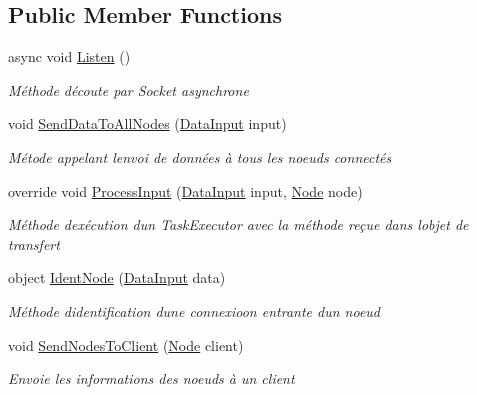 \subsection*{Public Member Functions}
\begin{DoxyCompactItemize}
\item 
async void \hyperlink{class_node_net_1_1_network_1_1_orch_1_1_orchestrator_a3adf37c5b27377234431ecdec0a2dc98}{Listen} ()
\begin{DoxyCompactList}\small\item\em Méthode d\textquotesingle{}écoute par Socket asynchrone \end{DoxyCompactList}\item 
void \hyperlink{class_node_net_1_1_network_1_1_orch_1_1_orchestrator_ad866995c960161d951c53c62cd4c446a}{Send\+Data\+To\+All\+Nodes} (\hyperlink{class_node_net_1_1_data_1_1_data_input}{Data\+Input} input)
\begin{DoxyCompactList}\small\item\em Métode appelant l\textquotesingle{}envoi de données à tous les noeuds connectés \end{DoxyCompactList}\item 
override void \hyperlink{class_node_net_1_1_network_1_1_orch_1_1_orchestrator_a1868c3dad9eb8763a7aaae1ef15862ed}{Process\+Input} (\hyperlink{class_node_net_1_1_data_1_1_data_input}{Data\+Input} input, \hyperlink{class_node_net_1_1_network_1_1_nodes_1_1_node}{Node} node)
\begin{DoxyCompactList}\small\item\em Méthode d\textquotesingle{}exécution d\textquotesingle{}un Task\+Executor avec la méthode reçue dans l\textquotesingle{}objet de transfert \end{DoxyCompactList}\item 
object \hyperlink{class_node_net_1_1_network_1_1_orch_1_1_orchestrator_a2cfb309a5a30e4bb85709b999c7d80ec}{Ident\+Node} (\hyperlink{class_node_net_1_1_data_1_1_data_input}{Data\+Input} data)
\begin{DoxyCompactList}\small\item\em Méthode d\textquotesingle{}identification d\textquotesingle{}une connexioon entrante d\textquotesingle{}un noeud \end{DoxyCompactList}\item 
void \hyperlink{class_node_net_1_1_network_1_1_orch_1_1_orchestrator_a3b69251ec97470cdff773fc310cee138}{Send\+Nodes\+To\+Client} (\hyperlink{class_node_net_1_1_network_1_1_nodes_1_1_node}{Node} client)
\begin{DoxyCompactList}\small\item\em Envoie les informations des noeuds à un client \end{DoxyCompactList}\item 

\end{DoxyCompactItemize}
